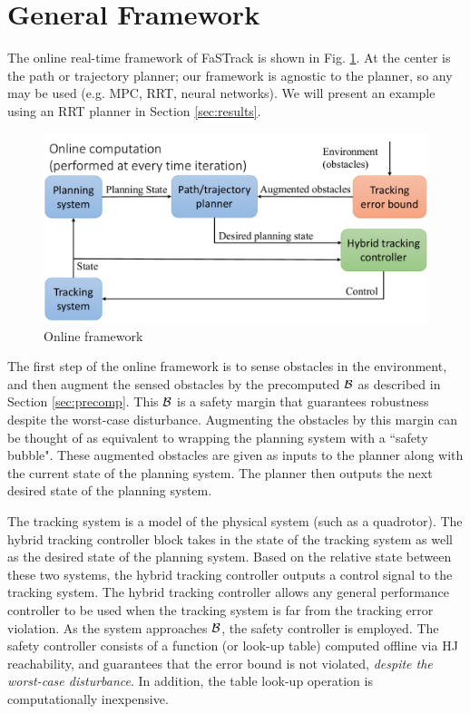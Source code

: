 \section{General Framework \label{sec:framework}}
The online real-time framework of FaSTrack is shown in Fig. \ref{fig:fw_online}. At the center is the path or trajectory planner; our framework is agnostic to the planner, so any may be used (e.g. MPC, RRT, neural networks). We will present an example using an RRT planner in Section \ref{sec:results}.
\begin{figure}[]
  \centering
	\includegraphics[width=1\columnwidth]{fig/framework_online}
	\caption{Online framework}
	\label{fig:fw_online}
	\vspace{-.1in}
\end{figure}

The first step of the online framework is to sense obstacles in the environment, and then augment the sensed obstacles by the precomputed $\mathcal B$ as described in Section \ref{sec:precomp}. This $\mathcal B$ is a safety margin that guarantees robustness despite the worst-case disturbance. Augmenting the obstacles by this margin can be thought of as equivalent to wrapping the planning system with a ``safety bubble". These augmented obstacles are given as inputs to the planner along with the current state of the planning system. The planner then outputs the next desired state of the planning system. 

The tracking system is a model of the physical system (such as a quadrotor). The hybrid tracking controller block takes in the state of the tracking system as well as the desired state of the planning system. Based on the relative state between these two systems, the hybrid tracking controller outputs a control signal to the tracking system. The hybrid tracking controller allows any general performance controller to be used when the tracking system is far from the tracking error violation. As the system approaches $\mathcal B$, the safety controller is employed.  The safety controller consists of a function (or look-up table) computed offline via HJ reachability, and guarantees that the error bound is not violated, \textit{despite the worst-case disturbance}. In addition, the table look-up operation is computationally inexpensive.

